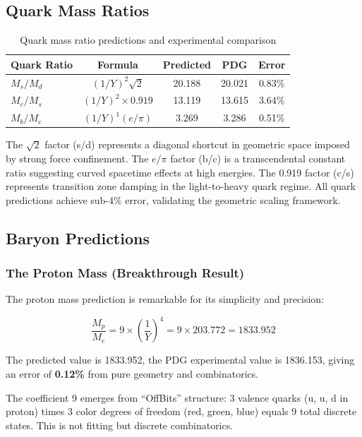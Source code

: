 \documentclass[11pt]{article}
\begin{document}
\subsection{Quark Mass Ratios}

\begin{table}[H]
\centering
\caption{Quark mass ratio predictions and experimental comparison}
\begin{tabular}{lcccc}
\toprule
\textbf{Quark Ratio} & \textbf{Formula} & \textbf{Predicted} & \textbf{PDG} & \textbf{Error} \\
\midrule
$M_s/M_d$ & $(1/Y)^2 \sqrt{2}$ & 20.188 & 20.021 & 0.83\% \\
$M_c/M_s$ & $(1/Y)^2 \times 0.919$ & 13.119 & 13.615 & 3.64\% \\
$M_b/M_c$ & $(1/Y)^1 (e/\pi)$ & 3.269 & 3.286 & 0.51\% \\
\bottomrule
\end{tabular}
\end{table}

The $\sqrt{2}$ factor (s/d) represents a diagonal shortcut in geometric space imposed by strong force confinement. The $e/\pi$ factor (b/c) is a transcendental constant ratio suggesting curved spacetime effects at high energies. The 0.919 factor (c/s) represents transition zone damping in the light-to-heavy quark regime. All quark predictions achieve sub-4\% error, validating the geometric scaling framework.

\subsection{Baryon Predictions}

\subsubsection{The Proton Mass (Breakthrough Result)}

The proton mass prediction is remarkable for its simplicity and precision:

\begin{equation}
\frac{M_p}{M_e} = 9 \times \left(\frac{1}{Y}\right)^4 = 9 \times 203.772 = 1833.952
\end{equation}

The predicted value is 1833.952, the PDG experimental value is 1836.153, giving an error of \textbf{0.12\%} from pure geometry and combinatorics.

The coefficient 9 emerges from ``OffBits'' structure: 3 valence quarks (u, u, d in proton) times 3 color degrees of freedom (red, green, blue) equals 9 total discrete states. This is not fitting but discrete combinatorics.
\end{document}
